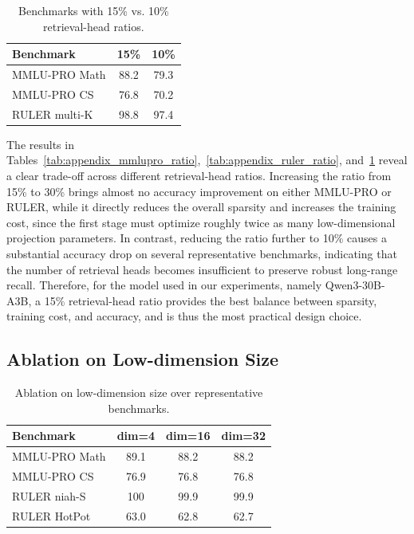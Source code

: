 \documentclass{llmxive}
\providecommand{\arraystretch}{0.94}
\begin{document}
\begin{table}[ht]
    \centering
    \normalsize
    \setlength{\tabcolsep}{6pt}
    \renewcommand{\arraystretch}{1.10}
    \begin{tabular}{lcc}
        \toprule
        \textbf{Benchmark} & \textbf{15\%} & \textbf{10\%} \\
        \midrule
        MMLU-PRO Math & 88.2 & 79.3 \\
        MMLU-PRO CS & 76.8 & 70.2 \\
        RULER multi-K & 98.8 & 97.4 \\
        \bottomrule
    \end{tabular}
\caption{Benchmarks with 15\% vs. 10\% retrieval-head ratios.}
\label{tab:appendix_ratio_small}
\end{table}

The results in Tables~\ref{tab:appendix_mmlupro_ratio},~\ref{tab:appendix_ruler_ratio}, and~\ref{tab:appendix_ratio_small} reveal a clear trade-off across different retrieval-head ratios. Increasing the ratio from 15\% to 30\% brings almost no accuracy improvement on either MMLU-PRO or RULER, while it directly reduces the overall sparsity and increases the training cost, since the first stage must optimize roughly twice as many low-dimensional projection parameters. In contrast, reducing the ratio further to 10\% causes a substantial accuracy drop on several representative benchmarks, indicating that the number of retrieval heads becomes insufficient to preserve robust long-range recall. Therefore, for the model used in our experiments, namely Qwen3-30B-A3B, a 15\% retrieval-head ratio provides the best balance between sparsity, training cost, and accuracy, and is thus the most practical design choice.

\subsection{Ablation on Low-dimension Size}
\label{appd:lowdim}


\begin{table}[ht]
    \centering
    \small
    \begin{tabular}{lccc}
        \toprule
        \textbf{Benchmark} & \textbf{dim=4} & \textbf{dim=16} & \textbf{dim=32} \\
        \midrule
        MMLU-PRO Math & 89.1 & 88.2 & 88.2 \\
        MMLU-PRO CS & 76.9 & 76.8 & 76.8 \\
        RULER niah-S & 100 & 99.9 & 99.9 \\
        RULER HotPot & 63.0 & 62.8 & 62.7 \\
        \bottomrule
    \end{tabular}
\caption{Ablation on low-dimension size over representative benchmarks.}
\label{tab:appendix_lowdim_accuracy}
\end{table}
\end{document}
